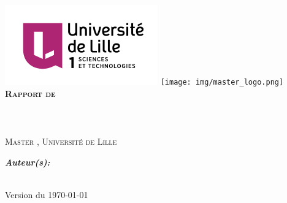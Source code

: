 \begin{titlepage}
\begin{center}

\includegraphics[scale=0.8]{img/lille_logo.png}
\hfill
\texttt{[image: img/master\_logo.png]}\\[4.5cm]

\textsc{\Large \bfseries Rapport de \ue}\\[0.5cm]

\HRule \\[0.5cm]
{ \Large \bfseries \underline{\titleReport}\\[0.5cm]}
\HRule \\[0.5cm]

\textsc{\large Master \masterName, Université de Lille}\\[2cm]

\begin{minipage}{0.4\textwidth}
\begin{flushleft} \large
\emph{\bfseries Auteur(s):}\\
\firstNameO \textsc{\lastNameO} \\
\firstNameT \textsc{\lastNameT}
\end{flushleft}
\end{minipage}

\vfill

{\large Version du \today}

\end{center}
\end{titlepage}